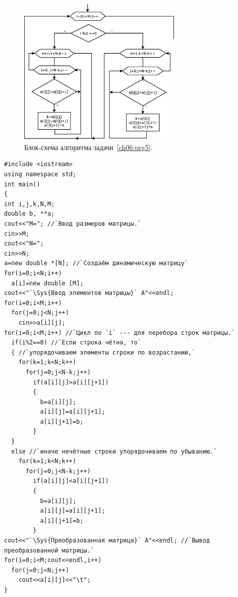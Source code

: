 \begin{figure}[htb]
\begin{center}
\includegraphics[width=0.7\textwidth]{img/ris_6_10}
\caption{Блок-схема алгоритма задачи~\ref{ch06:prg5}.}
\label{ch06:refDrawing9}
\end{center}
\end{figure}

\begin{lstlisting}
#include <iostream>
using namespace std;
int main()
{
int i,j,k,N,M;
double b, **a; 
cout<<"M="; //`Ввод размеров матрицы.`
cin>>M;
cout<<"N=";
cin>>N;
a=new double *[N]; //`Создаём динамическую матрицу`
for(i=0;i<N;i++)
  a[i]=new double [M];
cout<<"`\Sys{Ввод элементов матрицы}` A"<<endl;
for(i=0;i<M;i++)
  for(j=0;j<N;j++)
    cin>>a[i][j];
for(i=0;i<M;i++) //`Цикл по `i` --- для перебора строк матрицы.`
  if(i%2==0) //`Если строка чётна, то`
  { //`упорядочиваем элементы строки по возрастанию,`
    for(k=1;k<N;k++)
      for(j=0;j<N-k;j++)
        if(a[i][j]>a[i][j+1])
        {
          b=a[i][j];
          a[i][j]=a[i][j+1];
          a[i][j+1]=b;
        }
  }
  else //`иначе нечётные строки упорядочиваем по убыванию.`
    for(k=1;k<N;k++)
      for(j=0;j<N-k;j++)
        if(a[i][j]<a[i][j+1])
        {
          b=a[i][j];
          a[i][j]=a[i][j+1];
          a[i][j+1]=b;
        }
cout<<"`\Sys{Преобразованная матрица}` A"<<endl; //`Вывод преобразованной матрицы.`
for(i=0;i<M;cout<<endl,i++)
  for(j=0;j<N;j++)
    cout<<a[i][j]<<"\t";
}
\end{lstlisting}



